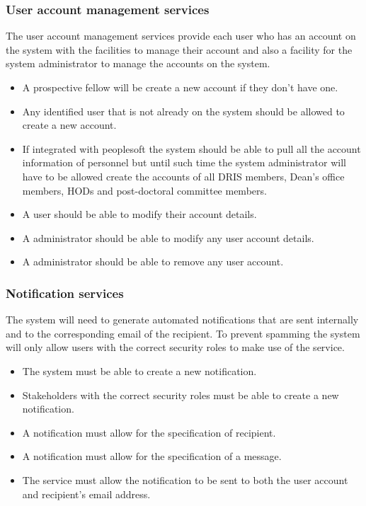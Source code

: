 \documentclass[12pt]{article}
\begin{document}
\subsubsection{User account management services}
	The user account management services provide each user who has an account on the system with the facilities to manage their account and also a facility for the system administrator to manage the accounts on the system.
	\begin{itemize}
		\item A prospective fellow will be create a new account if they don't have one.
		\item Any identified user that is not already on the system should be allowed to create a new account.
		\item If integrated with peoplesoft the system should be able to pull all the account information of personnel but until such time the system administrator will have to be allowed create the accounts of all DRIS members, Dean's office members, HODs and post-doctoral committee members.	
		\item A user should be able to modify their account details.
		\item A administrator should be able to modify any user account details.
		\item A administrator should be able to remove any user account.
	\end{itemize}
\subsubsection{Notification services}
	The system will need to generate automated notifications that are sent internally and to the corresponding email of the recipient. To prevent spamming the system will only allow users with the correct security roles to make use of the service.
	\begin{itemize}
		\item The system must be able to create a new notification.
		\item Stakeholders with the correct security roles must be able to create a new notification.
		\item A notification must allow for the specification of recipient.
		\item A notification must allow for the specification of a message.
		\item The service must allow the notification to be sent to both the user account and recipient's email address.
	\end{itemize}
\end{document}
